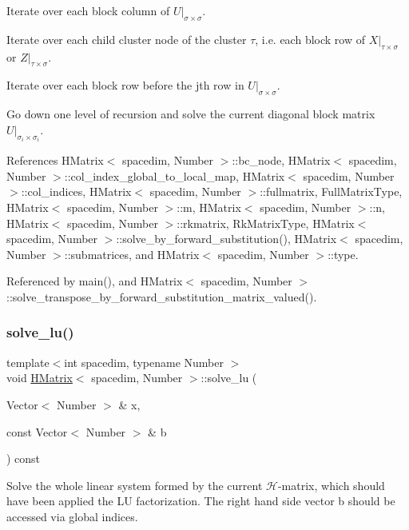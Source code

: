 Iterate over each block column of $U\vert_{\sigma\times\sigma}$.

Iterate over each child cluster node of the cluster $\tau$, i.\+e. each block row of $X\vert_{\tau\times\sigma}$ or $Z\vert_{\tau\times\sigma}$.

Iterate over each block row before the j\textquotesingle{}th row in $U\vert_{\sigma\times\sigma}$.

Go down one level of recursion and solve the current diagonal block matrix $U\vert_{\sigma_i \times \sigma_i}$.

References H\+Matrix$<$ spacedim, Number $>$\+::bc\+\_\+node, H\+Matrix$<$ spacedim, Number $>$\+::col\+\_\+index\+\_\+global\+\_\+to\+\_\+local\+\_\+map, H\+Matrix$<$ spacedim, Number $>$\+::col\+\_\+indices, H\+Matrix$<$ spacedim, Number $>$\+::fullmatrix, Full\+Matrix\+Type, H\+Matrix$<$ spacedim, Number $>$\+::m, H\+Matrix$<$ spacedim, Number $>$\+::n, H\+Matrix$<$ spacedim, Number $>$\+::rkmatrix, Rk\+Matrix\+Type, H\+Matrix$<$ spacedim, Number $>$\+::solve\+\_\+by\+\_\+forward\+\_\+substitution(), H\+Matrix$<$ spacedim, Number $>$\+::submatrices, and H\+Matrix$<$ spacedim, Number $>$\+::type.



Referenced by main(), and H\+Matrix$<$ spacedim, Number $>$\+::solve\+\_\+transpose\+\_\+by\+\_\+forward\+\_\+substitution\+\_\+matrix\+\_\+valued().

\mbox{\label{classHMatrix_a83e9dd55091e7eaed11ffb803321c49d}} 
\subsubsection{\texorpdfstring{solve\+\_\+lu()}{solve\_lu()}}
{\footnotesize\ttfamily template$<$int spacedim, typename Number $>$ \\
void \hyperlink{classHMatrix}{H\+Matrix}$<$ spacedim, Number $>$\+::solve\+\_\+lu (\begin{DoxyParamCaption}\item[{Vector$<$ Number $>$ \&}]{x,  }\item[{const Vector$<$ Number $>$ \&}]{b }\end{DoxyParamCaption}) const}

Solve the whole linear system formed by the current $\mathcal{H}$-\/matrix, which should have been applied the LU factorization. The right hand side vector {\ttfamily b} should be accessed via global indices.


